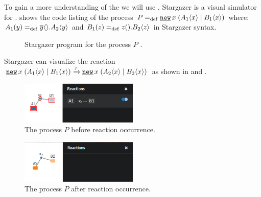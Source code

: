 To gain a more understanding of the \picalc{} we will use \cite{stargazer}. Stargazer is a visual simulator for \picalc{}.  shows the code listing of the process $P\define\procres{x}{(\procpar{\proccall{A_1}{x}}{\proccall{B_1}{x}})}$ where: $A_1(y)=_{\mathrm{def}}{}\overline{y}\langle{}\rangle.A_2\langle y\rangle$ and $B_1(z)=_{\mathrm{def}}{}z({}).B_2\langle z\rangle$ in Stargazer syntax.
\begin{figure}[ht!]

\caption{Stargazer program for the process $P$ .}
\label{pi_visualization_stargazer_code}
\end{figure}

Stargazer can visualize the reaction $\procres{x}{(\procpar{\proccall{A_1}{x}}{\proccall{B_1}{x}})} \transs{\tau} \procres{x}{(\procpar{\proccall{A_2}{x}}{\proccall{B_2}{x}})}$ as shown in
 and .
\begin{figure}[htbp]
	\centering
	\includegraphics[width=0.5\textwidth]{./images/pi_visualization_stargazer_Before_react.png}
	\caption{The process $P$ before reaction occurrence.}
	\label{pi_visualization_stargazer_Before_react}
\end{figure}

\begin{figure}[htbp]
	\centering
	\includegraphics[width=0.5\textwidth]{./images/pi_visualization_stargazer_After_react.png}
	\caption{The process $P$ after reaction occurrence.}
	\label{pi_visualization_stargazer_After_react}
\end{figure}